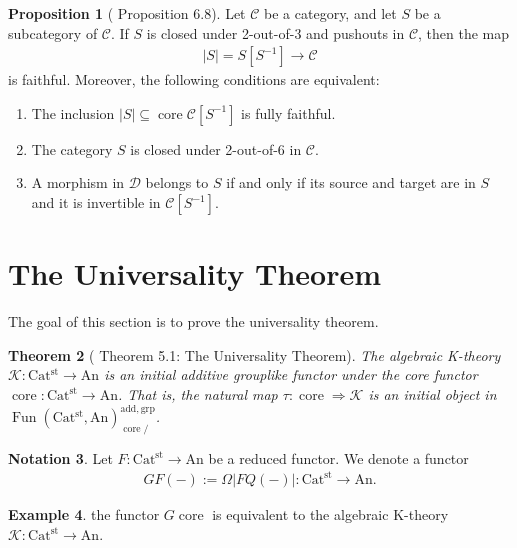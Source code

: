 \documentclass[a4paper,dvipdfmx,11pt,reqno]{amsart}
\DeclareMathOperator{\Fun}{Fun}
\newcommand{\C}{\mathcal{C}}
\newcommand{\D}{\mathcal{D}}
\newcommand{\K}{\mathcal{K}}
\DeclareMathOperator{\core}{core}
\newcommand{\An}{\mathrm{An}}
\newcommand{\Catst}{\mathrm{Cat^{st}}}
\newtheorem{theorem}{Theorem}[section]
\theoremstyle{definition}
\newtheorem{example}[theorem]{Example}
\newtheorem{notation}[theorem]{Notation}
\newtheorem{proposition}[theorem]{Proposition}
\begin{document}
\begin{proposition}[\cite{HLS23} Proposition 6.8] \label{HLS23.prop.6.8} 
  Let $\C$ be a category, and let $S$ be a subcategory of $\C$.
  If $S$ is closed under 2-out-of-3 and pushouts in $\C$, then the map 
  \begin{align*}
    |S| = S[S^{-1}] \to \C
  \end{align*}
  is faithful. 
  Moreover, the following conditions are equivalent:
  \begin{enumerate}
    \item The inclusion $|S| \subseteq \core\C[S^{-1}]$ is fully faithful.
    \item The category $S$ is closed under 2-out-of-6 in $\C$.
    \item A morphism in $\D$ belongs to $S$ if and only if its source and target are in $S$ and it is invertible in $\C[S^{-1}]$.
  \end{enumerate}
\end{proposition}


\section{The Universality Theorem}

The goal of this section is to prove the universality theorem.

\begin{theorem}[\cite{HLS23} Theorem 5.1: The Universality Theorem] \label{thrm.universality_theorem}
  The algebraic K-theory $\K : \Catst \to \An$ is an initial additive grouplike functor under the core functor $\core : \Catst \to \An$.
  That is, the natural map $\tau : \core \Rightarrow \K$ is an initial object in $\Fun(\Catst,\An)^{\mathrm{add,grp}}_{\core/}$.
\end{theorem}

\begin{notation}
  Let $F : \Catst \to \An$ be a reduced functor.
  We denote a functor 
  \begin{align*}
    GF(-) := \Omega|FQ(-)| : \Catst \to \An. 
  \end{align*}
\end{notation}

\begin{example}
  the functor $G\core$ is equivalent to the algebraic K-theory $\K : \Catst \to \An$.
\end{example}
\end{document}
